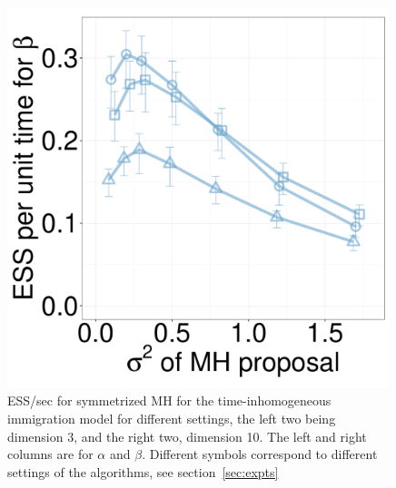 \begin{figure}[H]
\begin{minipage}[hp]{0.24\linewidth}
	\end{minipage}
  \begin{minipage}[hp]{0.24\linewidth}
  \centering
    \includegraphics [width=0.99\textwidth, angle=0]{figs/new_whole_exp_figs/mh_cq_beta_dim10.pdf}
	\end{minipage}
    \caption{ESS/sec for symmetrized MH for the time-inhomogeneous immigration model for different settings, the left two being dimension 3, and the right two, dimension 10. The left and right columns are for $\alpha$ and $\beta$. Different symbols correspond to different settings of the algorithms, see section~\ref{sec:expts}}
     \label{fig:mhESS_CQ}
  \end{figure}

